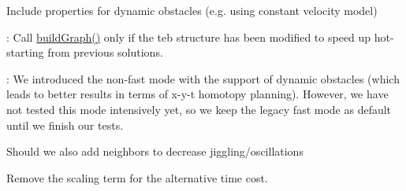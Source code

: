 \begin{DoxyRefList}
Include properties for dynamic obstacles (e.\+g. using constant velocity model)  
\item[类 \mbox{\hyperlink{classteb__local__planner_1_1TebOptimalPlanner}{teb\+\_\+local\+\_\+planner\+::Teb\+Optimal\+Planner}} ]\label{todo__todo000005}%
%
\+: Call \mbox{\hyperlink{classteb__local__planner_1_1TebOptimalPlanner_a2b9ad598cec60b56906806603fa45497}{build\+Graph()}} only if the teb structure has been modified to speed up hot-\/starting from previous solutions. 

\+: We introduced the non-\/fast mode with the support of dynamic obstacles (which leads to better results in terms of x-\/y-\/t homotopy planning). However, we have not tested this mode intensively yet, so we keep the legacy fast mode as default until we finish our tests.  
\item[全局 \mbox{\hyperlink{classteb__local__planner_1_1TebOptimalPlanner_a0361f9f5c2fb8cd561cdf1b34db9a32b}{teb\+\_\+local\+\_\+planner\+::Teb\+Optimal\+Planner\+::Add\+Edges\+Dynamic\+Obstacles}} (double weight\+\_\+multiplier=1.\+0)]\label{todo__todo000008}%
%
Should we also add neighbors to decrease jiggling/oscillations  
\item[全局 \mbox{\hyperlink{classteb__local__planner_1_1TebOptimalPlanner_af1821ce3262ce2c607d482b40eccaa57}{teb\+\_\+local\+\_\+planner\+::Teb\+Optimal\+Planner\+::compute\+Current\+Cost}} (double obst\+\_\+cost\+\_\+scale=1.\+0, double viapoint\+\_\+cost\+\_\+scale=1.\+0, bool alternative\+\_\+time\+\_\+cost=false)]\label{todo__todo000006}%
%
Remove the scaling term for the alternative time cost. 


\end{DoxyRefList}
